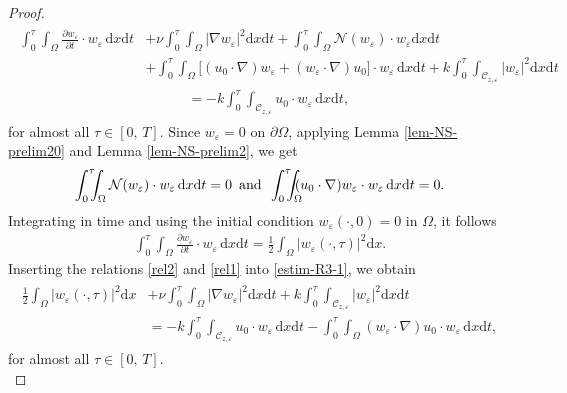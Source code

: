 \documentclass[a4paper,12pt,reqno,natbib]{amsart}
\newcommand{\dx} {\displaystyle\mathrm{d}x}
\newcommand{\dt} {\displaystyle\mathrm{d}t}
\def\N{\mathcal N}
\begin{document}
\begin{proof}
\begin{align}
\begin{split}
    \int_0^{\tau}\int_{\Omega}\frac {\partial w_\varepsilon}{\partial t}\cdot w_\varepsilon\, \dx\dt&+\nu\int_0^{\tau}\int_\Omega\big|\nabla w_\varepsilon\big|^2\dx\dt+\int_0^{\tau}\int_\Omega\N(w_\varepsilon)\cdot w_\varepsilon\dx\dt\\
&+\int_0^\tau\int_\Omega\big[ (u_0\cdot\nabla )w_\varepsilon + (w_\varepsilon \cdot \nabla)u_0\big]\cdot w_\varepsilon\,\dx\dt+k\int_0^{\tau}\int_{\mathcal{C}_{z,\varepsilon}}\big|w_\varepsilon\big|^2\dx\dt\\
&\qquad\quad=-k\int_0^{\tau}\int_{\mathcal{C}_{z,\varepsilon}}u_0\cdot w_\varepsilon\,\dx\dt,
\end{split}
\end{align} 
for almost all $\tau\in [0,\,T].$ Since $w_\varepsilon=0$ on $\partial \Omega$, applying Lemma \ref{lem-NS-prelim20} and Lemma \ref{lem-NS-prelim2}, we get
\begin{eqnarray}\label{rel2}
\int_0^{\tau}\hspace{-0.2cm}\int_{\Omega}\N(w_\varepsilon) \cdot w_\varepsilon\, \dx\dt=0\,\text{ and }
\,\int_0^{\tau}\hspace{-0.2cm}\int_{\Omega} \hspace{-0.2cm}(u_0\cdot \nabla) w_\varepsilon \cdot w_\varepsilon\, \dx\dt=0.
\end{eqnarray}
Integrating in time and using the initial condition $w_\varepsilon(\cdot,0)=0$ in $\Omega$, it follows
\begin{eqnarray}\label{rel1}
\displaystyle \int_0^{\tau}\int_{\Omega}\frac {\partial w_\varepsilon}{\partial t}\cdot w_\varepsilon\, \dx\dt=\frac{1}{2} \int_{\Omega}\big|w_\varepsilon(\cdot,\tau)\big|^2\dx.
\end{eqnarray}
Inserting the relations \eqref{rel2} and \eqref{rel1} into \eqref{estim-R3-1}, we obtain
\begin{align}
\begin{split}\label{estim-R3-1-new}
   \frac{1}{2} \int_{\Omega}\big|w_\varepsilon(\cdot,\tau)\big|^2\dx&+\nu\int_0^{\tau}\int_\Omega\big|\nabla w_\varepsilon\big|^2\dx\dt+k\int_0^{\tau}\int_{\mathcal{C}_{z,\varepsilon}}\big|w_\varepsilon\big|^2\dx\dt\\
   &=-k\int_0^{\tau}\int_{\mathcal{C}_{z,\varepsilon}}u_0\cdot w_\varepsilon\,\dx\dt-\int_0^\tau\int_\Omega(w_\varepsilon \cdot \nabla)u_0\cdot w_\varepsilon\,\dx\dt,
\end{split}
\end{align} 
for almost all $\tau\in[0,\,T].$ \\


\end{proof}
\end{document}
